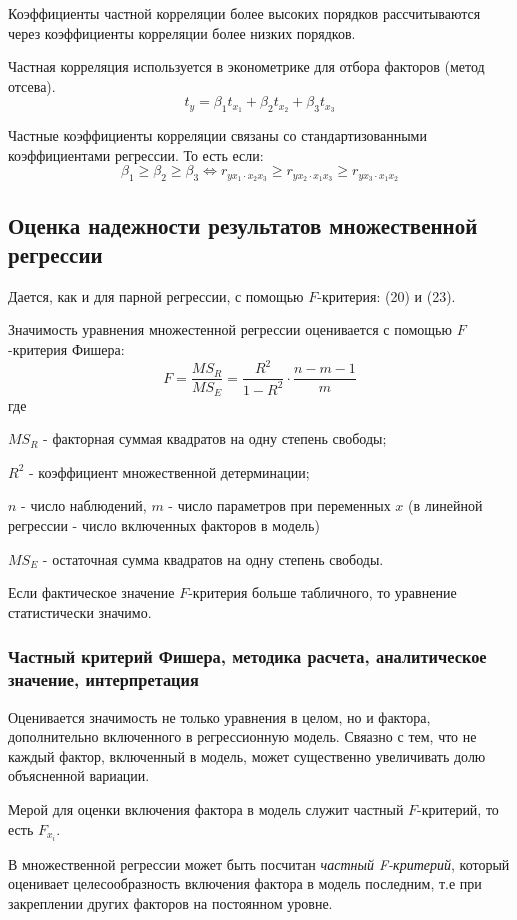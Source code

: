 \documentclass[aps,%
12pt,%
final,%
oneside,
onecolumn,%
musixtex, %
superscriptaddress,%
centertags]{article} %
\theoremstyle{plain}
\theoremstyle{definition}
\theoremstyle{remark}
\begin{document}
Коэффициенты частной корреляции более высоких порядков рассчитываются через коэффициенты корреляции более низких порядков.

Частная корреляция используется в эконометрике для отбора факторов (метод отсева).
$$ t_y = \beta_1 t_{x_1} + \beta_2 t_{x_2} + \beta_3 t_{x_3}$$

Частные коэффициенты корреляции связаны со стандартизованными коэффициентами регрессии. То есть если:
$$ \beta_1 \geq \beta_2 \geq \beta_3 \Leftrightarrow r_{yx_1 \cdot x_2x_3} \geq r_{yx_2 \cdot x_1x_3} \geq  r_{yx_3 \cdot x_1x_2}$$

\newpage
\subsection{Оценка надежности результатов множественной регрессии}

Дается, как и для парной регрессии, с помощью $F$-критерия: (20) и (23).

Значимость уравнения множестенной регрессии оценивается с помощью $F$-критерия Фишера:
$$F = \frac{MS_R}{MS_E} = \frac{R^2}{1-R^2} \cdot \frac{n-m-1}{m}$$
где 

$MS_R$ - факторная суммая квадратов на одну степень свободы;

$R^2$ - коэффициент множественной детерминации;

$n$ - число наблюдений, $m$ - число параметров при переменных $x$ (в линейной регрессии - число включенных факторов в модель)

$MS_E$ - остаточная сумма квадратов на одну степень свободы.

Если фактическое значение $F$-критерия больше табличного, то уравнение статистически значимо.

\subsubsection{Частный критерий Фишера, методика расчета, аналитическое значение, интерпретация}

Оценивается значимость не только уравнения в целом, но и фактора, дополнительно включенного в регрессионную модель. Свяазно с тем, что не каждый фактор, включенный в модель, может существенно увеличивать долю объясненной вариации.

Мерой для оценки включения фактора в модель служит частный $F$-критерий, то есть $F_{x_i}$.

В множественной регрессии может быть посчитан \textit{частный F-критерий}, который оценивает целесообразность включения фактора в модель последним, т.е при закреплении других факторов на постоянном уровне.
\end{document}
